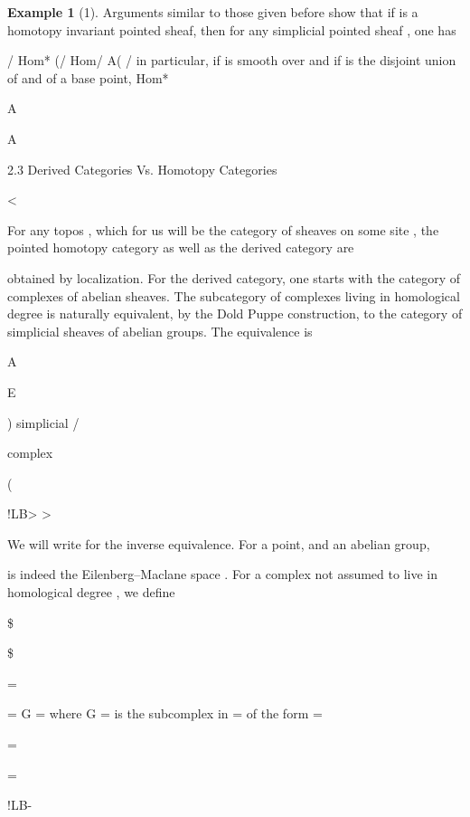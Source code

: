 \documentclass[11pt,a4paper]{article}
\theoremstyle{plain}
\theoremstyle{definition}
\newtheorem{example}[theorem]{Example}
\begin{document}
\begin{example}[1]
Arguments similar to those given before show that if is a homotopy
invariant pointed sheaf, then for any simplicial pointed sheaf , one has

/
Hom*  (/   Hom/   A( /  
in particular, if  is smooth over  and if  is the disjoint union of  and of a
base point,
Hom*    

A 

A 

\end{example}

2.3 Derived Categories Vs. Homotopy Categories

<



For any topos , which for us will be the category of sheaves on some site ,
the pointed homotopy category
as well as the derived category
are

obtained by localization. For the derived category, one starts with the category of
complexes of abelian sheaves. The subcategory of complexes living in homological
degree  is naturally equivalent, by the Dold Puppe construction, to the category
of simplicial sheaves of abelian groups. The equivalence is

A 

E



) simplicial /  

complex

(

 !LB>  > 






We will write for the inverse equivalence. For a point, and an abelian group,

 is indeed the Eilenberg--Maclane space
. For a complex
not
assumed to live in homological degree  , we define

\$



 \$

=

=
G =
where G = is the subcomplex in = of the form
=

=

= 

!LB- 
\end{document}
